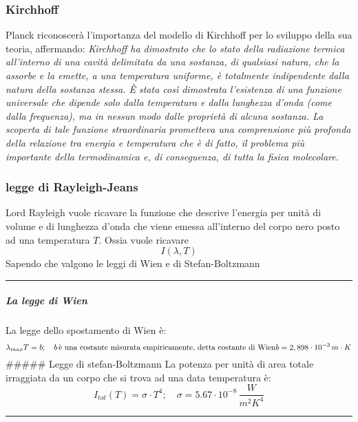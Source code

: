 \documentclass[11pt]{article}
\begin{document}
\hypertarget{kirchhoff}{%
\subsubsection{Kirchhoff }\label{kirchhoff}}

Planck riconoscerà l'importanza del modello di Kirchhoff per lo sviluppo
della sua teoria, affermando: \emph{Kirchhoff ha dimostrato che lo
stato della radiazione termica all'interno di una cavità delimitata da
una sostanza, di qualsiasi natura, che la assorbe e la emette, a una
temperatura uniforme, è totalmente indipendente dalla natura della
sostanza stessa. È stata così dimostrata l'esistenza di una funzione
universale che dipende solo dalla temperatura e dalla lunghezza d'onda
(come dalla frequenza), ma in nessun modo dalle proprietà di alcuna
sostanza. La scoperta di tale funzione straordinaria prometteva una
comprensione più profonda della relazione tra energia e temperatura che
è di fatto,  il problema più importante della termodinamica e, di conseguenza, di tutta la fisica molecolare.}

\hypertarget{legge-di-rayleigh-jeans}{%
\subsubsection{legge di Rayleigh-Jeans }\label{legge-di-rayleigh-jeans}}

Lord Rayleigh vuole ricavare la funzione che descrive l'energia per
unità di volume e di lunghezza d'onda che viene emessa all'interno del
corpo nero posto ad una temperatura \(T\). Ossia vuole ricavare \[
I(\lambda,T)
\] Sapendo che valgono le leggi di Wien e di Stefan-Boltzmann

\begin{center}\rule{0.5\linewidth}{0.5pt}\end{center}

\hypertarget{la-legge-di-wien}{%
\subparagraph{La legge di Wien}\label{la-legge-di-wien}}

La legge dello spostamento di Wien è: \[
\lambda_{max}T=b; \quad b\,\text{è una costante misurata empiricamente, detta costante di Wien}\\
b=2,898\cdot 10^{-3}\, m\cdot K
\] \#\#\#\#\# Legge di stefan-Boltzmann La potenza per unità di area
totale irraggiata da un corpo che si trova ad una data temperatura è: \[
I_{tot}(T)=\sigma\cdot T^4; \quad \sigma=5.67\cdot10^{-8}\, \frac{W}{m^2K^4}
\]

\begin{center}\rule{0.5\linewidth}{0.5pt}\end{center}
\end{document}
